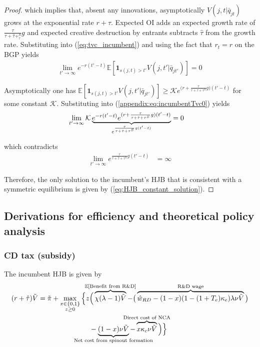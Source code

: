 \documentclass[11pt,english]{article}
\begin{document}
\begin{proof}
	which implies that, absent any innovations, asymptotically $V(j,t|\bar{q}_{jt})$ grows at the exponential rate $r + \hat{\tau}$. Expected OI adds an expected growth rate of $\frac{\tau}{\tau + \hat{\tau} +_\tau^S} g$ and expected creative destruction by entrants subtracts $\hat{\tau}$ from the growth rate. Substituting into (\ref{eq:tvc_incumbent}) and using the fact that $r_t = r$ on the BGP yields
	\begin{align}
	\lim_{t' \to \infty} e^{-r (t' -t)} \mathbb{E}[ \mathbf{1}_{s(j,t) > t'} V(j,t'|\bar{q}_{jt'}) ] = 0 \label{appendix:eq:incumbentTvc0}
	\end{align}
	
	Asymptotically one has $\mathbb{E}[ \mathbf{1}_{s(j,t) > t'} V(j,t'|\bar{q}_{jt'}) ] \ge \mathcal{K} e^{ \big(r + \frac{\tau}{\tau + \hat{\tau} + \tau^S} g \big) (t' - t)}$ for some constant $\mathcal{K}$. Substituting into (\ref{appendix:eq:incumbentTvc0}) yields
	\begin{align}
	\lim_{t' \to \infty} \mathcal{K} \underbrace{e^{-r (t' -t)} e^{ (r + \frac{\tau}{\tau + \hat{\tau} + \tau^S} g ) (t' - t)}}_{\mathclap{e^{\frac{\tau}{\tau + \hat{\tau} + \tau^S}g(t'-t)}}} &= 0 \label{appendix:eq:incumbentTvc1}
	\end{align}
	
	which contradicts
	\begin{align}
		\lim_{t' \to \infty} e^{\frac{\tau}{\tau + \hat{\tau} + \tau^S}g(t'-t)} &= \infty
	\end{align} 
	
	Therefore, the only solution to the incumbent's HJB that is consistent with a symmetric equilibrium is given by (\ref{eq:HJB_constant_solution}).
	
\end{proof}

\subsection{Derivations for efficiency and theoretical policy analysis}

\subsubsection{CD tax (subsidy)}\label{appendix:model:efficiencyderivations:CDtax}

The incumbent HJB is given by 
\begin{align}
(r + \hat{\tau}) \tilde{V} = \tilde{\pi} + \max_{\substack{x \in \{0,1\} \\ z \ge 0}} \Big\{z &\Big( \overbrace{\chi (\lambda - 1) \tilde{V}}^{\mathclap{\mathbb{E}[\textrm{Benefit from R\&D}]}}-  \big( \overbrace{\hat{w}_{RD} - (1-x)(1-(1+T_e)\kappa_e)\lambda \nu \tilde{V}}^{\mathclap{\text{R\&D wage}}}\big) \label{eq:hjb_incumbent_entryTax} \nonumber \\ 
&-  \underbrace{(1-x) \nu \tilde{V}}_{\mathclap{\text{Net cost from spinout formation}}} - \overbrace{x \kappa_{c} \nu \tilde{V}}^{\mathclap{\text{Direct cost of NCA}}}\Big) \Big\} 
\end{align}
\end{document}
